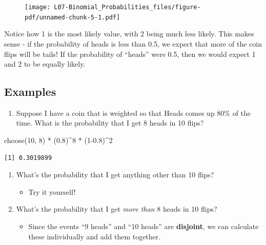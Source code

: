 \documentclass[
  letterpaper,
  DIV=11,
  numbers=noendperiod,
  oneside]{scrreprt}
\newenvironment{Shaded}{\begin{snugshade}}{\end{snugshade}}
\newcommand{\DecValTok}[1]{\textcolor[rgb]{0.68,0.00,0.00}{#1}}
\newcommand{\FloatTok}[1]{\textcolor[rgb]{0.68,0.00,0.00}{#1}}
\newcommand{\FunctionTok}[1]{\textcolor[rgb]{0.28,0.35,0.67}{#1}}
\newcommand{\NormalTok}[1]{\textcolor[rgb]{0.00,0.23,0.31}{#1}}
\newcommand{\SpecialCharTok}[1]{\textcolor[rgb]{0.37,0.37,0.37}{#1}}
\providecommand{\tightlist}{%
  \setlength{\itemsep}{0pt}\setlength{\parskip}{0pt}}\usepackage{longtable,booktabs,array}
\begin{document}
\begin{figure}[H]

{\centering \texttt{[image: L07-Binomial\_Probabilities\_files/figure-pdf/unnamed-chunk-5-1.pdf]}

}

\end{figure}

Notice how 1 is the most likely value, with 2 being much less likely.
This makes sense - if the probability of heads is less than 0.5, we
expect that more of the coin flips will be tails! If the probability of
``heads'' were 0.5, then we would expect 1 and 2 to be equally likely.

\hypertarget{examples-1}{%
\subsection{Examples}\label{examples-1}}

\begin{enumerate}
\def\labelenumi{\arabic{enumi}.}
\tightlist
\item
  Suppose I have a coin that is weighted so that Heads comes up 80\% of
  the time. What is the probability that I get 8 heads in 10 flips?
\end{enumerate}

\begin{Shaded}
\begin{Highlighting}[]
\FunctionTok{choose}\NormalTok{(}\DecValTok{10}\NormalTok{, }\DecValTok{8}\NormalTok{) }\SpecialCharTok{*}\NormalTok{ (}\FloatTok{0.8}\NormalTok{)}\SpecialCharTok{\^{}}\DecValTok{8} \SpecialCharTok{*}\NormalTok{ (}\DecValTok{1}\FloatTok{{-}0.8}\NormalTok{)}\SpecialCharTok{\^{}}\DecValTok{2}
\end{Highlighting}
\end{Shaded}

\begin{verbatim}
[1] 0.3019899
\end{verbatim}

\begin{enumerate}
\def\labelenumi{\arabic{enumi}.}
\setcounter{enumi}{1}
\tightlist
\item
  What's the probability that I get anything other than 10 flips?

  \begin{itemize}
  \tightlist
  \item
    Try it yourself!
  \end{itemize}
\item
  What's the probability that I get \emph{more than} 8 heads in 10
  flips?

  \begin{itemize}
  \tightlist
  \item
    Since the events ``9 heads'' and ``10 heads'' are \textbf{disjoint},
    we can calculate these individually and add them together.
  \end{itemize}
\end{enumerate}
\end{document}
